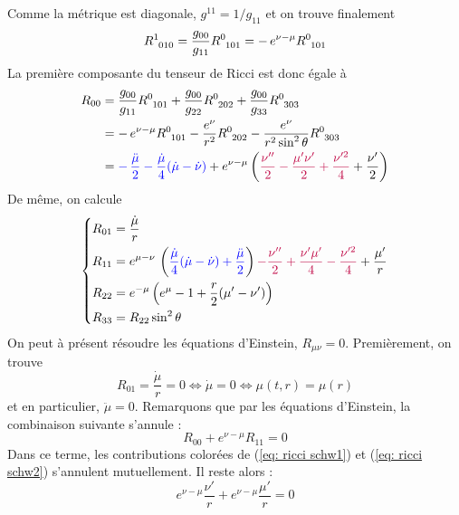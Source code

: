 Comme la métrique est diagonale, $g^{11} = 1/g_{11}$ et on trouve finalement 
\begin{equation}
    R\indices{^1_{01 0}} = \frac{g_{00}}{g_{11}}R\indices{^0_{101}} = - \, e^{\nu-\mu} R\indices{^0_{101}}
\end{equation}
La première composante du tenseur de Ricci est donc égale à
\begin{align}
    R_{00} &=\frac{g_{00}}{g_{11}}R\indices{^0_{101}} + \frac{g_{00}}{g_{22}}R\indices{^0_{202}} + \frac{g_{00}}{g_{33}}R\indices{^0_{303}}\\
    & = - \, e^{\nu-\mu} R\indices{^0_{101}} - \frac{e^\nu}{r^2}R\indices{^0_{202}} - \frac{e^\nu}{r^2 \sin^2\theta}R\indices{^0_{303}} \\
    \label{eq: ricci schw1}
    & = \blue{- \, \frac{\ddot{\mu}}{2} - \frac{\dot{\mu}}{4}(\dot{\mu} - \dot{\nu})} + e^{\nu-\mu} \lt \purple{\frac{\nu''}{2} - \frac{\mu' \nu'}{2} + \frac{\nu'^2}{4}} +\frac{\nu'}{2}\rt
\end{align}
De même, on calcule
\begin{align}
    \label{eq: ricci schw2}
    \begin{dcases}
        R_{01} = \frac{\dot{\mu}}{r} \\
        R_{11} = e^{\mu-\nu} \, \left( \textcolor{blue}{\frac{\dot{\mu}}{4} ( \dot{\mu} - \dot{\nu} ) +\frac{\ddot{\mu}}{2}} \right) \textcolor{purple}{- \frac{\nu''}{2} + \frac{\nu' \mu'}{4} - \frac{\nu'^2}{4}} + \frac{\mu'}{r} \\
        R_{22} = e^{-\mu} \left( e^\mu - 1 + \frac{r}{2} (\mu' - \nu') \right) \\
        R_{33} = R_{22} \sin^2 \theta 
    \end{dcases}
\end{align}
On peut à présent résoudre les équations d'Einstein, $R_{\mu\nu} = 0$. Premièrement, on trouve
\begin{equation}
    R_{01} = \frac{\dot{\mu}}{r} = 0 \iff \dot{\mu} = 0 \iff \mu(t,r) = \mu(r)
\end{equation}
et en particulier, $\ddot{\mu} = 0$. Remarquons que par les équations d'Einstein, la combinaison suivante s'annule :
\begin{equation}
\label{eq:combinaison: eq d'Einstein pour Schwarzschild}
    R_{00} + e^{\nu-\mu} R_{11} = 0
\end{equation}
Dans ce terme, les contributions colorées de (\ref{eq: ricci schw1}) et (\ref{eq: ricci schw2}) s'annulent mutuellement. Il reste alors :
\begin{equation}
    e^{\nu-\mu} \frac{\nu'}{r} + e^{\nu-\mu} \frac{\mu'}{r} = 0
\end{equation}
